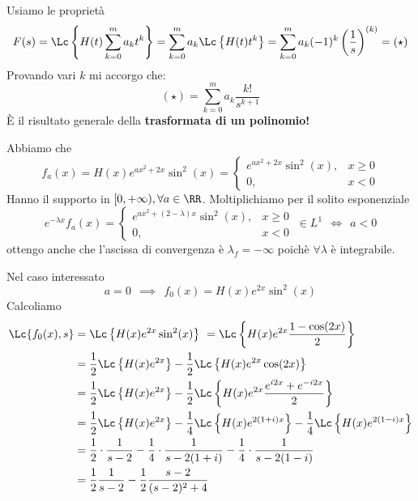 \Soluzione

Usiamo le proprietà
\begin{equation*}
F(s) = \Lc\left\{H(t)\sum^{m}_{k = 0} a_{k} t^{k}\right\} = \sum^{m}_{k = 0} a_{k}\Lc\left\{H(t) t^{k}\right\} = \sum^{m}_{k = 0} a_{k}(- 1)^{k}\left(\frac{1}{s}\right)^{(k)} = (\star)
\end{equation*}
Provando vari $\displaystyle k$ mi accorgo che:
\begin{equation*}
(\star) = \sum^{m}_{k = 0} a_{k}\frac{k!}{s^{k + 1}}
\end{equation*}
È il risultato generale della \textbf{trasformata di un polinomio!}

\Soluzione

Abbiamo che
\begin{equation*}
f_{a}(x) = H(x) e^{ax^{2} + 2x}\sin^{2}(x) =
\begin{cases}
e^{ax^{2} + 2x}\sin^{2}(x), & x \geq 0\\
0, & x < 0
\end{cases}
\end{equation*}
Hanno il supporto in $\displaystyle [ 0, + \infty), \forall a\in \RR $. Moltiplichiamo per il solito esponenziale
\begin{equation*}
e^{- \lambda x} f_{a}(x) =
\begin{cases}
e^{ax^{2} + (2 - \lambda) x}\sin^{2}(x), & x \geq 0\\
0, & x < 0
\end{cases} \ \in L^{1} \ \ \iff \ \ a < 0
\end{equation*}
ottengo anche che l'ascissa di convergenza è $\displaystyle \lambda_{f} = - \infty $ poichè $\displaystyle \forall \lambda $ è integrabile.

Nel caso interessato
\begin{equation*}
a = 0\ \ \implies \ \ f_{0}(x) = H(x) e^{2x}\sin^{2}(x)
\end{equation*}
Calcoliamo
\begin{align*}
\Lc\{f_{0}(x), s\} & = \Lc\left\{H(x) e^{2x}\sin^{2}(x)\right\} \ = \Lc\left\{H(x) e^{2x}\frac{1 - \cos(2x)}{2}\right\}\\
 & = \frac{1}{2}\Lc\left\{H(x) e^{2x}\right\} - \frac{1}{2}\Lc\left\{H(x) e^{2x}\cos(2x)\right\}\\
 & = \frac{1}{2}\Lc\left\{H(x) e^{2x}\right\} - \frac{1}{2}\Lc\left\{H(x) e^{2x}\frac{e^{i2x} + e^{- i2x}}{2}\right\}\\
 & = \frac{1}{2}\Lc\left\{H(x) e^{2x}\right\} - \frac{1}{4}\Lc\left\{H(x) e^{2(1 + i) x}\right\} - \frac{1}{4}\Lc\left\{H(x) e^{2(1 - i) x}\right\}\\
 & = \frac{1}{2} \cdot \frac{1}{s - 2} - \frac{1}{4} \cdot \frac{1}{s - 2(1 + i)} - \frac{1}{4} \cdot \frac{1}{s - 2(1 - i)}\\
 & = \frac{1}{2}\frac{1}{s - 2} - \frac{1}{2}\frac{s - 2}{(s - 2)^{2} + 4}
\end{align*}


